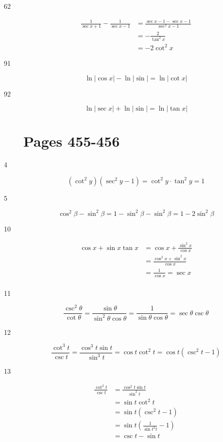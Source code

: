 \documentclass[fleqn,addpoints]{exam}
\begin{document}
\begin{description}
\item[62]
\begin{align*}
  \frac{1}{\sec x + 1} - \frac{1}{\sec x - 1} &= \frac{\sec x - 1 - \sec x - 1}{\sec^2 x - 1} \\
  &= - \frac{2}{\tan^2 x} \\
  &= - 2 \cot^2 x
\end{align*}

\item[91]
\[
  \ln |\cos x| - \ln|\sin| = \ln|\cot x|
\]

\item[92]
\[
  \ln |\sec x| + \ln|\sin| = \ln|\tan x|
\]

\section{Pages 455-456}
\item[4]
\[
  (\cot^2 y) (\sec^2 y - 1 ) = \cot^2 y \cdot \tan^2 y = 1
\]

\item[5]
\[
  \cos^2 \beta - \sin^2 \beta = 1 - \sin^2 \beta - \sin^2 \beta = 1 - 2 \sin^2 \beta
\]

\item[10]
\begin{align*}
  \cos x + \sin x \tan x &= \cos x + \frac{\sin^2 x}{\cos x} \\
  &= \frac{\cos^2 x + \sin^2 x}{\cos x} \\
  &= \frac{1}{\cos x} = \sec x \\
\end{align*}

\item[11]
\[
  \frac{\csc^2 \theta}{\cot \theta} = \frac{\sin \theta}{\sin^2 \theta \cos \theta} = \frac{1}{\sin \theta \cos \theta} 
    = \sec \theta \csc \theta
\]

\item[12]
\[
  \frac{\cot^3 t}{\csc t} = \frac{\cos^3 t \sin t}{\sin^3 t} = \cos t \cot^2 t = \cos t(\csc^2 t - 1)
\]

\item[13]
\begin{align*}
  \frac{\cot^2 t}{\csc t} &= \frac{\cos^2 t \sin t}{\sin^2 t} \\
  &= \sin t \cot^2 t \\
  &= \sin t(\csc^2 t - 1) \\
  &= \sin t (\frac{1}{\sin t^2 t} - 1) \\
  &= \csc t - \sin t
\end{align*}


\end{description}
\end{document}
